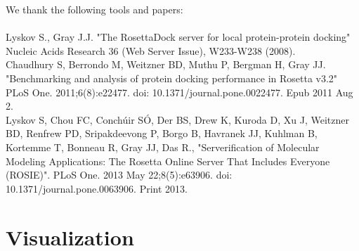 \documentclass{article}
\begin{document}
We thank the following tools and papers: \\\\

Lyskov S., Gray J.J. "The RosettaDock server for local protein-protein docking" Nucleic Acids Research 36 (Web Server Issue), W233-W238 (2008).\\

Chaudhury S, Berrondo M, Weitzner BD, Muthu P, Bergman H, Gray JJ. "Benchmarking and analysis of protein docking performance in Rosetta v3.2" PLoS One. 2011;6(8):e22477. doi: 10.1371/journal.pone.0022477. Epub 2011 Aug 2.\\

Lyskov S, Chou FC, Conchúir SÓ, Der BS, Drew K, Kuroda D, Xu J, Weitzner BD, Renfrew PD, Sripakdeevong P, Borgo B, Havranek JJ, Kuhlman B, Kortemme T, Bonneau R, Gray JJ, Das R., "Serverification of Molecular Modeling Applications: The Rosetta Online Server That Includes Everyone (ROSIE)". PLoS One. 2013 May 22;8(5):e63906. doi: 10.1371/journal.pone.0063906. Print 2013.



\section{Visualization}
\end{document}
